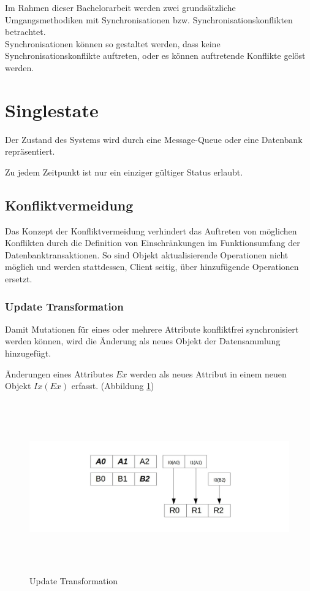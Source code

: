 \documentclass[oneside,11pt,parskip=half,ngerman]{scrreprt}
\makeatletter
\def\maxwidth{\ifdim\Gin@nat@width>\linewidth\linewidth
\else\Gin@nat@width\fi}
\let\Oldincludegraphics\includegraphics
\renewcommand{\includegraphics}[1]{\Oldincludegraphics[width=\maxwidth,height=20em,keepaspectratio]{#1}}
\makeatother
\begin{document}

Im Rahmen dieser Bachelorarbeit werden zwei grundsätzliche
Umgangsmethodiken mit Synchronisationen bzw. Synchronisationskonflikten
betrachtet.\\Synchronisationen können so gestaltet werden, dass keine
Synchronisationskonflikte auftreten, oder es können auftretende
Konflikte gelöst werden.\\

\section{Singlestate}\label{singlestate}

Der Zustand des Systems wird durch eine Message-Queue oder eine
Datenbank repräsentiert.

Zu jedem Zeitpunkt ist nur ein einziger gültiger Status erlaubt.

\subsection{Konfliktvermeidung}\label{konfliktvermeidung}

Das Konzept der Konfliktvermeidung verhindert das Auftreten von
möglichen Konflikten durch die Definition von Einschränkungen im
Funktionsumfang der Datenbanktransaktionen. So sind Objekt
aktualisierende Operationen nicht möglich und werden stattdessen, Client
seitig, über hinzufügende Operationen ersetzt.

\subsubsection{Update Transformation}\label{update-transformation}

Damit Mutationen für eines oder mehrere Attribute konfliktfrei
synchronisiert werden können, wird die Änderung als neues Objekt der
Datensammlung hinzugefügt.

Änderungen eines Attributes \(Ex\) werden als neues Attribut in einem
neuen Objekt \(Ix(Ex)\) erfasst. (Abbildung \ref{fig:updatetransform})

\begin{figure}[htbp]
\centering
\includegraphics{img/update-transformation.jpg}
\caption{Update Transformation\label{fig:updatetransform}}
\end{figure}
\end{document}
